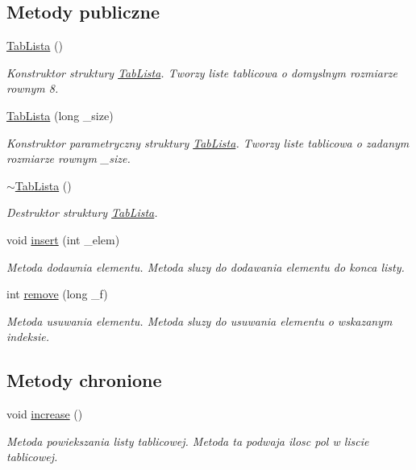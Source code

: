\subsection*{Metody publiczne}
\begin{DoxyCompactItemize}
\item 
\hyperlink{struct_tab_lista_ad3bfa98306e98b4e5bb7ff524e72078c}{Tab\-Lista} ()
\begin{DoxyCompactList}\small\item\em Konstruktor struktury \hyperlink{struct_tab_lista}{Tab\-Lista}. Tworzy liste tablicowa o domyslnym rozmiarze rownym 8. \end{DoxyCompactList}\item 
\hyperlink{struct_tab_lista_a95d23d52e0af187351b3fc1022ae4839}{Tab\-Lista} (long \-\_\-size)
\begin{DoxyCompactList}\small\item\em Konstruktor parametryczny struktury \hyperlink{struct_tab_lista}{Tab\-Lista}. Tworzy liste tablicowa o zadanym rozmiarze rownym \-\_\-size. \end{DoxyCompactList}\item 
\hyperlink{struct_tab_lista_a0b4a808158b370bbc5785ceef760a273}{$\sim$\-Tab\-Lista} ()
\begin{DoxyCompactList}\small\item\em Destruktor struktury \hyperlink{struct_tab_lista}{Tab\-Lista}. \end{DoxyCompactList}\item 
void \hyperlink{struct_tab_lista_a7bd3e5f62a81bfd3813ad874e8a9c059}{insert} (int \-\_\-elem)
\begin{DoxyCompactList}\small\item\em Metoda dodawnia elementu. Metoda sluzy do dodawania elementu do konca listy. \end{DoxyCompactList}\item 
int \hyperlink{struct_tab_lista_ad54a60e1ddfa8be90d977f740d8af601}{remove} (long \-\_\-f)
\begin{DoxyCompactList}\small\item\em Metoda usuwania elementu. Metoda sluzy do usuwania elementu o wskazanym indeksie. \end{DoxyCompactList}\end{DoxyCompactItemize}
\subsection*{Metody chronione}
\begin{DoxyCompactItemize}
\item 
void \hyperlink{struct_tab_lista_a9ae6a784d488c8b9885ccbc945225f9e}{increase} ()
\begin{DoxyCompactList}\small\item\em Metoda powiekszania listy tablicowej. Metoda ta podwaja ilosc pol w liscie tablicowej. \end{DoxyCompactList}\end{DoxyCompactItemize}
